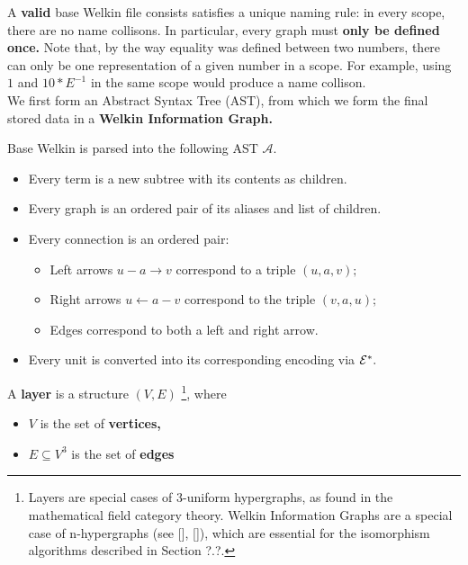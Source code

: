 A \textbf{valid} base Welkin file consists satisfies a unique naming rule: in every scope, there are no name collisons. In particular, every graph must \textbf{only be defined once.} Note that, by the way equality was defined between two numbers,
  there can only be one representation of a given number in a scope. For example, using $1$ and $10*E^{-1}$ in the same scope would produce a name collison.
\\ We first form an Abstract Syntax Tree (AST), from which we form the final stored data in a \textbf{Welkin Information Graph.}
\begin{definition}
  Base Welkin is parsed into the following AST $\mathcal{A}.$
  \begin{itemize}
	\item Every term is a new subtree with its contents as children.
    \item Every graph is an ordered pair of its aliases and list of children.
    \item Every connection is an ordered pair:
		  \begin{itemize}
			\item Left arrows $u - a \to v$ correspond to a triple $(u, a, v);$
			\item Right arrows $u \leftarrow a - v$ correspond to the triple $(v, a, u);$
			\item Edges correspond to both a left and right arrow.
		  \end{itemize}
	\item Every unit is converted into its corresponding encoding via $\mathcal{E}^{*}.$
  \end{itemize}
 \end{definition}
 \begin{definition}
   A \textbf{layer} is a structure $(V, E)$
   \footnote{Layers are special cases of 3-uniform hypergraphs, as found in the mathematical field category theory. Welkin Information Graphs are a special case of n-hypergraphs (see [], []), which are essential for the isomorphism algorithms described in Section ?.?.},
   where
   \begin{itemize}
     \item $V$ is the set of \textbf{vertices,}
     \item $E \subseteq V^{3}$ is the set of \textbf{edges}
   \end{itemize}
  \end{definition}

